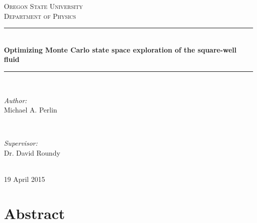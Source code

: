 \documentclass[11pt]{article}
\renewcommand{\title}{Optimizing Monte Carlo state space exploration
  of the square-well fluid}
\renewcommand{\author}{Michael A. Perlin}
\newcommand{\institution}{Oregon State University}
\newcommand{\department}{Department of Physics}
\newcommand{\supervisor}{Dr. David Roundy}
\renewcommand{\date}{19 April 2015}
\begin{document}
\begin{titlepage}

  \newcommand{\HRule}{\rule{\linewidth}{0.5mm}}

  \center

  \textsc{\LARGE \institution}\\[1.5cm]
  \textsc{\Large \department}\\[0.5cm]

  \HRule \\[0.4cm]
  { \huge \bfseries \title}\\[0.4cm]
  \HRule \\[1.5cm]

  \begin{minipage}{0.4\textwidth}
    \begin{flushleft} \large
      \emph{Author:}\\
      \author
    \end{flushleft}
  \end{minipage}
  ~
  \begin{minipage}{0.4\textwidth}
    \begin{flushright} \large
      \emph{Supervisor:} \\
      \supervisor
    \end{flushright}
  \end{minipage}\\[4cm]

  {\large\date}

  \vfill

\end{titlepage}

\thispagestyle{empty}

\newpage

\tableofcontents

\thispagestyle{empty}

\newpage



\thispagestyle{empty}

\newpage

\setcounter{page}{1}


\section*{Abstract}
\label{sec:abstract}
\end{document}
